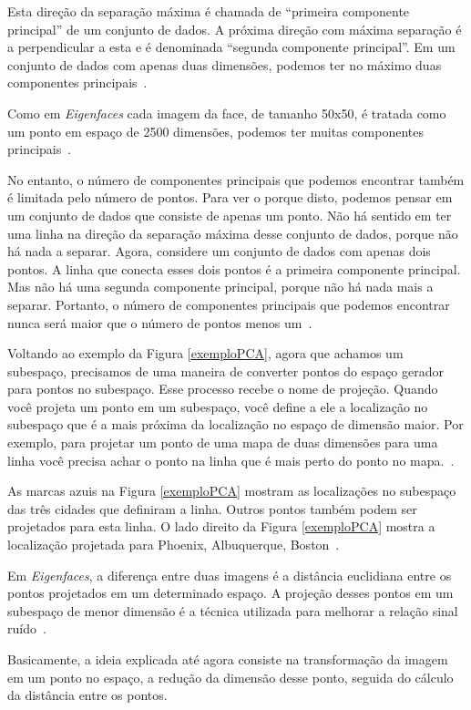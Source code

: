 Esta direção da separação máxima é chamada de ``primeira componente principal'' de um conjunto de dados. A próxima direção com máxima separação é a perpendicular a esta e é denominada ``segunda componente principal''. Em um conjunto de dados com apenas duas dimensões, podemos ter no máximo duas componentes principais~\cite{hewitt}.

Como em \textit{Eigenfaces} cada imagem da face, de tamanho 50x50, é tratada como um ponto em espaço de 2500 dimensões, podemos ter muitas componentes principais~\cite{hewitt}.

No entanto, o número de componentes principais que podemos encontrar também é limitada pelo número de pontos. Para ver o porque disto, podemos pensar em um conjunto de dados que consiste de apenas um ponto. Não há sentido em ter uma linha na direção da separação máxima desse conjunto de dados, porque não há nada a separar. Agora, considere um conjunto de dados com apenas dois pontos. A linha que conecta esses dois pontos é a primeira componente principal. Mas não há uma segunda componente principal, porque não há nada mais a separar. Portanto, o número de componentes principais que podemos encontrar nunca será maior que o número de pontos menos um~\cite{hewitt}.

Voltando ao exemplo da Figura \ref{exemploPCA}, agora que achamos um subespaço, precisamos de uma maneira de converter pontos do espaço gerador para pontos no subespaço. Esse processo recebe o nome de projeção. Quando você projeta um ponto em um subespaço, você define a ele a localização no subespaço que é a mais próxima da localização no espaço de dimensão maior. Por exemplo, para projetar um ponto de uma mapa de duas dimensões para uma linha você precisa achar o ponto na linha que é mais perto do ponto no mapa.~\cite{hewitt}.

As marcas azuis na Figura \ref{exemploPCA} mostram as localizações no subespaço das três cidades que definiram a linha. Outros pontos também podem ser projetados para esta linha. O lado direito da Figura \ref{exemploPCA} mostra a localização projetada para Phoenix, Albuquerque, Boston~\cite{hewitt}.

Em \textit{Eigenfaces}, a diferença entre duas imagens é a distância euclidiana entre os pontos projetados em um determinado espaço. A projeção desses pontos em um subespaço de menor dimensão é a técnica utilizada para melhorar a relação sinal ruído~\cite{hewitt}.

Basicamente, a ideia explicada até agora consiste na transformação da imagem em um ponto no espaço, a redução da dimensão desse ponto, seguida do cálculo da distância entre os pontos.


